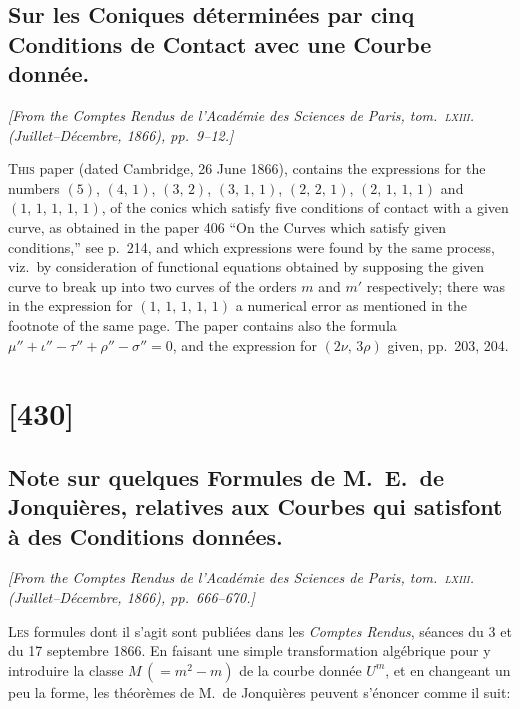 \documentclass[11pt,a4paper]{article}
\theoremstyle{plain}
\theoremstyle{definition}
\begin{document}
\subsection{Sur les Coniques d\'etermin\'ees par cinq Conditions de Contact avec une Courbe donn\'ee.}

\begin{center}
\textit{[From the Comptes Rendus de l'Acad\'emie des Sciences de Paris, tom.~\textsc{lxiii}.
(Juillet--D\'ecembre, 1866), pp.~9--12.]}
\end{center}

\textsc{This} paper (dated Cambridge, 26 June 1866), contains the expressions for the numbers
$(5)$, $(4,\,1)$, $(3,\,2)$, $(3,\,1,\,1)$, $(2,\,2,\,1)$, $(2,\,1,\,1,\,1)$ and $(1,\,1,\,1,\,1,\,1)$, of the conics which satisfy
five conditions of contact with a given curve, as obtained in the paper 406 ``On the
Curves which satisfy given conditions,'' see p.~214, and which expressions were found
by the same process, viz.\ by consideration of functional equations obtained by supposing
the given curve to break up into two curves of the orders $m$ and $m'$ respectively;
there was in the expression for $(1,\,1,\,1,\,1,\,1)$ a numerical error as mentioned in the
footnote of the same page.  The paper contains also the formula
$\mu'' + \iota'' - \tau'' + \rho'' - \sigma'' = 0$, and the expression for $(2\nu,\,3\rho)$ given, pp.~203, 204.

\clearpage

\section{[430]}
\subsection{Note sur quelques Formules de M.\ E.\ de Jonqui\`eres, relatives aux Courbes
qui satisfont \`a des Conditions donn\'ees.}

\begin{center}
\textit{[From the Comptes Rendus de l'Acad\'emie des Sciences de Paris, tom.~\textsc{lxiii}.
(Juillet--D\'ecembre, 1866), pp.~666--670.]}
\end{center}

\textsc{Les} formules dont il s'agit sont publi\'ees dans les \textit{Comptes Rendus}, s\'eances du 3
et du 17 septembre 1866.  En faisant une simple transformation alg\'ebrique pour y
introduire la classe $M\,(=m^2 - m)$ de la courbe donn\'ee $U^m$, et en changeant un peu la
forme, les th\'eor\`emes de M.\ de Jonqui\`eres peuvent s'\'enoncer comme il suit:
\end{document}
